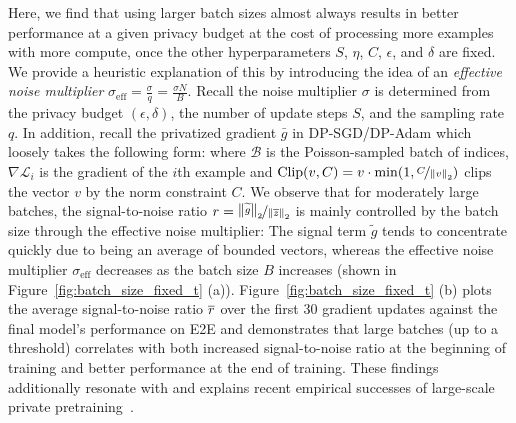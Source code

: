 Here, we find that using larger batch sizes almost always results in better performance at a given privacy budget at the cost of processing more examples with more compute, once the other hyperparameters $S$, $\eta$, $C$, $\epsilon$, and $\delta$ are fixed.
We provide a heuristic explanation of this by introducing the idea of an \textit{effective noise multiplier} $\sigma_{\text{eff}} = \tfrac{\sigma}{q} = \tfrac{\sigma N} {B}$.  
Recall the noise multiplier $\sigma$ is determined from the privacy budget $(\epsilon, \delta)$, the number of update steps $S$, and the sampling rate $q$. 
In addition, recall the privatized gradient $\bar{g}$ in DP-SGD/DP-Adam which loosely takes the following form:
where $\mathcal{B}$ is the Poisson-sampled batch of indices, $\nabla \mathcal{L}_i$ is the gradient of the $i$th example and $\text{Clip}(v, C) = v \cdot \min(1, \nicefrac{C}{\left\lVert v\right\rVert_2} )$ clips the vector $v$ by the norm constraint $C$. 
We observe that for moderately large batches, the signal-to-noise ratio 
$r = \nicefrac{\left\lVert\widetilde{g}\right\rVert_2}{\left\lVert\mathop{\overline{z}}\right\rVert_2}$ is mainly controlled by the batch size through the effective noise multiplier: 
The signal term $\widetilde{g}$ tends to concentrate quickly due to being an average of bounded vectors, whereas the effective noise multiplier $\sigma_{\text{eff}}$ decreases as the batch size $B$ increases (shown in Figure~\ref{fig:batch_size_fixed_t} (a)).
Figure~\ref{fig:batch_size_fixed_t} (b) plots the average signal-to-noise ratio $\mathop{\overline{r}}$ over the first 30 gradient updates against the final model's performance on E2E and demonstrates that large batches (up to a threshold) correlates with both increased signal-to-noise ratio at the beginning of training and better performance at the end of training.
These findings additionally resonate with and explains recent empirical successes of large-scale private pretraining~\citep{anil2021large}.
